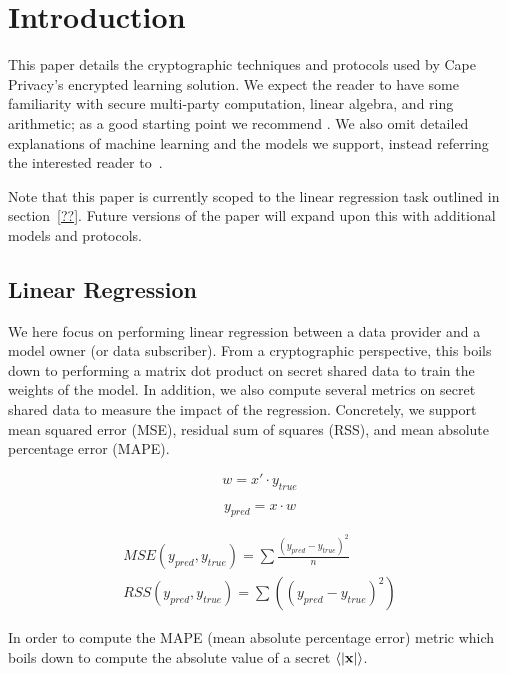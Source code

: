 
\section{Introduction}

This paper details the cryptographic techniques and protocols used by Cape Privacy's encrypted learning solution. We expect the reader to have some familiarity with secure multi-party computation, linear algebra, and ring arithmetic; as a good starting point we recommend \cite{evans2017pragmatic}. We also omit detailed explanations of machine learning and the models we support, instead referring the interested reader to~\cite{??}.

Note that this paper is currently scoped to the linear regression task outlined in section~\ref{??}. Future versions of the paper will expand upon this with additional models and protocols.


\subsection{Linear Regression}

We here focus on performing linear regression between a data provider and a model owner (or data subscriber). From a cryptographic perspective, this boils down to performing a matrix dot product on secret shared data to train the weights of the model. In addition, we also compute several metrics on secret shared data to measure the impact of the regression. Concretely, we support mean squared error (MSE), residual sum of squares (RSS), and mean absolute percentage error (MAPE).

$$
w = x' \cdot y_{\mathit{true}}
$$

$$
y_{\mathit{pred}} = x \cdot w
$$

\begin{align*}
\mathit{MSE}(y_{\mathit{pred}}, y_{\mathit{true}}) = \sum \frac{ (y_{\mathit{pred}} - y_{\mathit{true}})^2 }{n}
\\
\mathit{RSS}(y_{\mathit{pred}}, y_{\mathit{true}}) = \sum \left( (y_{\mathit{pred}} - y_{\mathit{true}})^2 \right)
\end{align*}

In order to compute the MAPE (mean absolute percentage error) metric which boils down to compute
the absolute value of a secret $\langle {|\mathbf{x}|} \rangle$.


